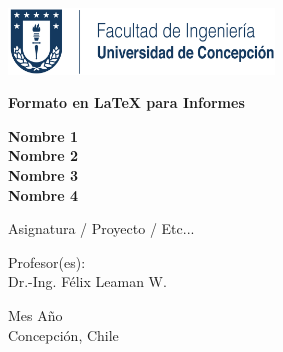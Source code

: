 	
\begin{center}
	
\includegraphics[height=50pt]{inge.png}
\vspace{5cm}


{\LARGE
\textbf{Formato en \LaTeX{} para Informes \\}
}
\vspace{2.5cm}

{\large
\textbf{Nombre 1\\}
\textbf{Nombre 2\\}
\textbf{Nombre 3\\}
\textbf{Nombre 4\\}
}
\vspace{2.5cm}

{\normalsize
Asignatura / Proyecto / Etc...\\
}
\vspace{3.5cm}


{\normalsize
Profesor(es):\\
Dr.-Ing. Félix Leaman W.
}
\vspace{0.5cm}

{\normalsize
Mes Año\\
Concepción, Chile
}
\vspace*{\fill}




\end{center}



